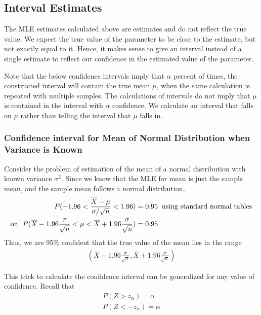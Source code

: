 \documentclass[../probability-notes.tex]{subfiles}
\begin{document}
    
    \subsection{Interval Estimates}
    The MLE estimates calculated above are estimates and do not reflect the true value. We expect the true value of the parameter to be close to the estimate, but not exactly equal to it. Hence, it makes sense to give an interval instead of a single estimate to reflect our confidence in the estimated value of the parameter.\newline

    Note that the below confidence intervals imply that $\alpha$ percent of times, the constructed interval will contain the true mean $\mu$, when the same calculation is repeated with multiple samples. The calculations of intervals do not imply that $\mu$ is contained in the interval with $\alpha$ confidence. We calculate an interval that falls on $\mu$ rather than telling the interval that $\mu$ falls in.\newline

    \subsubsection{Confidence interval for Mean of Normal Distribution when Variance is Known}
    Consider the problem of estimation of the mean of a normal distribution with known variance $\sigma^{2}$. Since we know that the MLE for mean is just the sample mean, and the sample mean follows a normal distribution,
    \begin{align*}
        P(-1.96 < \frac{\overline{X} - \mu}{\sigma / \sqrt{n}} < 1.96) &= 0.95 \text{\: using standard normal tables}\\
        \text{or, \:} P(\overline{X} - 1.96\frac{\sigma}{\sqrt{n}}< \mu < \overline{X} + 1.96\frac{\sigma}{\sqrt{n}}) &= 0.95
    \end{align*}
    Thus, we are 95\% confident that the true value of the mean lies in the range 
    \begin{align*}
        (\overline{X} - 1.96\frac{\sigma}{\sqrt{n}}, \overline{X} + 1.96\frac{\sigma}{\sqrt{n}})
    \end{align*}

    This trick to calculate the confidence interval can be generalized for any value of confidence. Recall that
    \begin{align*}
        P(Z > z_{\alpha}) = \alpha\\
        P(Z < -z_{\alpha}) = \alpha
    \end{align*}
\end{document}
